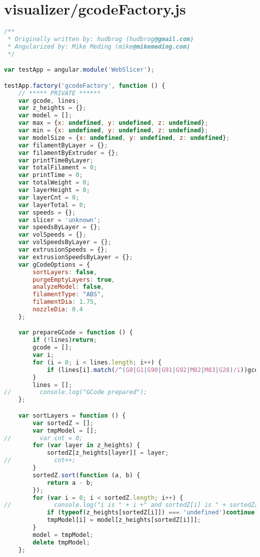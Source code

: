 \section{visualizer/gcodeFactory.js}
\begin{lstlisting}[language=JavaScript, label={lst:gcodeFactory}, caption=gcodeFactory.js is the main gcode header parsing code.]
/**
 * Originally written by: hudbrog (hudbrog@gmail.com)
 * Angularized by: Mike Meding (mike@mikemeding.com)
 */

var testApp = angular.module('WebSlicer');

testApp.factory('gcodeFactory', function () {
    // ***** PRIVATE ******
    var gcode, lines;
    var z_heights = {};
    var model = [];
    var max = {x: undefined, y: undefined, z: undefined};
    var min = {x: undefined, y: undefined, z: undefined};
    var modelSize = {x: undefined, y: undefined, z: undefined};
    var filamentByLayer = {};
    var filamentByExtruder = {};
    var printTimeByLayer;
    var totalFilament = 0;
    var printTime = 0;
    var totalWeight = 0;
    var layerHeight = 0;
    var layerCnt = 0;
    var layerTotal = 0;
    var speeds = {};
    var slicer = 'unknown';
    var speedsByLayer = {};
    var volSpeeds = {};
    var volSpeedsByLayer = {};
    var extrusionSpeeds = {};
    var extrusionSpeedsByLayer = {};
    var gCodeOptions = {
        sortLayers: false,
        purgeEmptyLayers: true,
        analyzeModel: false,
        filamentType: "ABS",
        filamentDia: 1.75,
        nozzleDia: 0.4
    };

    var prepareGCode = function () {
        if (!lines)return;
        gcode = [];
        var i;
        for (i = 0; i < lines.length; i++) {
            if (lines[i].match(/^(G0|G1|G90|G91|G92|M82|M83|G28)/i))gcode.push(lines[i]);
        }
        lines = [];
//        console.log("GCode prepared");
    };

    var sortLayers = function () {
        var sortedZ = [];
        var tmpModel = [];
//        var cnt = 0;
        for (var layer in z_heights) {
            sortedZ[z_heights[layer]] = layer;
//            cnt++;
        }
        sortedZ.sort(function (a, b) {
            return a - b;
        });
        for (var i = 0; i < sortedZ.length; i++) {
//            console.log("i is " + i +" and sortedZ[i] is " + sortedZ[i] + "and z_heights[] is " + z_heights[sortedZ[i]] );
            if (typeof(z_heights[sortedZ[i]]) === 'undefined')continue;
            tmpModel[i] = model[z_heights[sortedZ[i]]];
        }
        model = tmpModel;
        delete tmpModel;
    };


\end{lstlisting}
